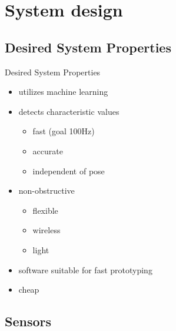 \section{System design}

\subsection{Desired System Properties}

\begin{frame}{Desired System Properties}
    \begin{itemize}
        \item utilizes machine learning
        \item detects characteristic values
            \begin{itemize}
                \item fast (goal 100Hz)
                \item accurate
                \item independent of pose
            \end{itemize}
        \item non-obstructive
            \begin{itemize}
                \item flexible
                \item wireless
                \item light
            \end{itemize}
        \item software suitable for fast prototyping
        \item cheap
    \end{itemize}
\end{frame}

\subsection{Sensors}

